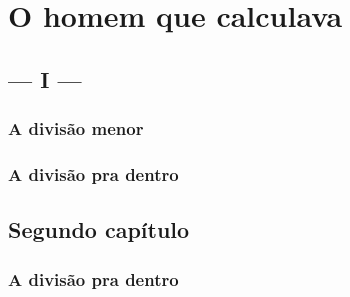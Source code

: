 \part{O homem que calculava}

\chapter{— I —}
\lipsum[1]
\section{A divisão menor}
\lipsum[1]
\asterisc
\lipsum[2]
\section{A divisão pra dentro}
\lipsum[3-4]
\asterisc
\lipsum[5]
\asterisc
\lipsum[1-40]

\chapter{Segundo capítulo}
\section{A divisão pra dentro}
\lipsum[3-4]
\asterisc
\lipsum[5]
\asterisc
\lipsum[1-40]
